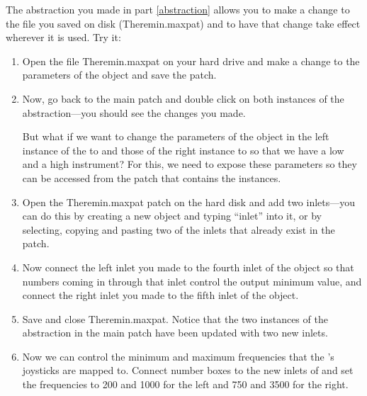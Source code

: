 The abstraction you made in part \ref{abstraction} allows you to make a 
change to the file you saved on disk
(Theremin.maxpat) and to have that change take effect wherever it is used.
Try it:

\begin{enumerate}
\item Open the file Theremin.maxpat on your hard drive and make a change to the 
parameters of the  object and save the patch.

\item Now, go back to the main patch and double click on both instances of 
the  abstraction---you should see the changes you made.

But what if we want to change the parameters of the  object
in the left instance of the  to  
and those of the right instance to  so that we have a 
low and a high instrument?  For this, we need to expose these parameters so they can 
be accessed from the patch that contains the instances.  

\item Open the Theremin.maxpat patch on the hard disk and add two inlets---you can 
do this by creating a new object and typing ``inlet'' into it, or by selecting, copying
and pasting two of the inlets that already exist in the patch.

\item Now connect the left inlet you made to the fourth inlet of the  object
so that numbers coming in through that inlet control the output minimum value, and 
connect the right inlet you made to the fifth inlet of the  object.


\item Save and close Theremin.maxpat.  Notice that the two instances of the 
abstraction in the main patch have been updated with two new inlets.

\item Now we can control the minimum and maximum frequencies that the 
\gt's joysticks are mapped to.  Connect number boxes to the new inlets of 
and set the frequencies to 200 and 1000 for the left and 750 and 3500 for the right.


\end{enumerate}


